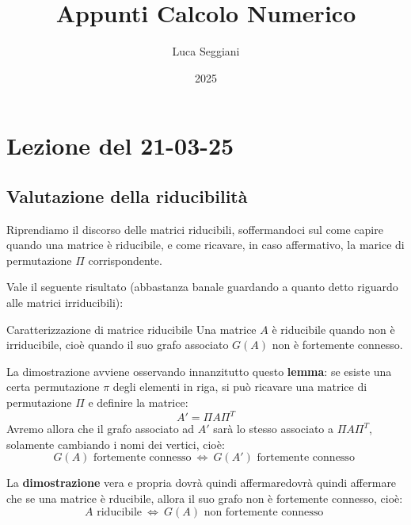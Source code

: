\documentclass[a4paper,11pt]{article}
\title{Appunti Calcolo Numerico}
\author{Luca Seggiani}
\date{2025}
\begin{document}
\section{Lezione del 21-03-25}

\thispagestyle{empty}
\pagestyle{fancy}

\lstset{style=codestyle, language=matlab}

\subsection{Valutazione della riducibilità}
Riprendiamo il discorso delle matrici riducibili, soffermandoci sul come capire quando una matrice è riducibile, e come ricavare, in caso affermativo, la marice di permutazione $\Pi$ corrispondente.

Vale il seguente risultato (abbastanza banale guardando a quanto detto riguardo alle matrici irriducibili):
\begin{theorem}{Caratterizzazione di matrice riducibile}
	Una matrice $A$ è riducibile quando non è irriducibile, cioè quando il suo grafo associato $G(A)$ non è fortemente connesso.
\end{theorem}

La dimostrazione avviene osservando innanzitutto questo \textbf{lemma}: se esiste una certa permutazione $\pi$ degli elementi in riga, si può ricavare una matrice di permutazione $\Pi$ e definire la matrice:
$$
A' = \Pi A \Pi^T
$$
Avremo allora che il grafo associato ad $A'$ sarà lo stesso associato a $\Pi A \Pi^T$, solamente cambiando i nomi dei vertici, cioè:
$$
G(A) \text{ fortemente connesso} \ \Leftrightarrow \  G(A') \text{ fortemente connesso }
$$

La \textbf{dimostrazione} vera e propria dovrà quindi affermaredovrà quindi affermare che se una matrice è rducibile, allora il suo grafo non è fortemente connesso, cioè:
$$
A \text{ riducibile} \ \Leftrightarrow \  G(A) \text{ non fortemente connesso }
$$
\end{document}
